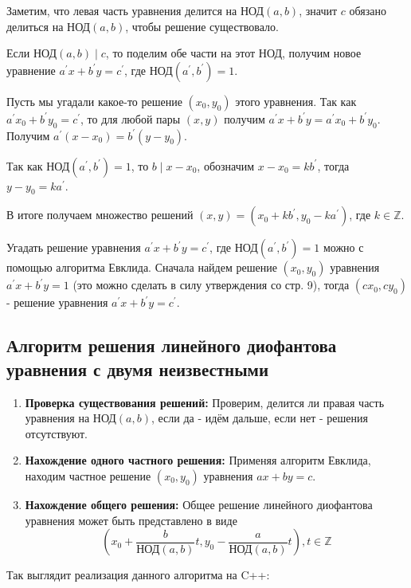 \documentclass[12pt, a4paper, openany]{book}
\begin{document}
    Заметим, что левая часть уравнения делится на $\text{НОД}(a, b)$, значит $c$ обязано делиться на $\text{НОД}(a, b)$, чтобы решение существовало.
    
    Если $\text{НОД}(a, b) \mid c$, то поделим обе части на этот НОД, получим новое уравнение $a^{'}x + b^{'}y = c^{'}$, где $\text{НОД}(a^{'}, b^{'}) = 1$.
    
    Пусть мы угадали какое-то решение $(x_0, y_0)$ этого уравнения. Так как $a^{'}x_0 + b^{'}y_0 = c^{'}$, то для любой пары $(x, y)$ получим $a^{'}x + b^{'}y = a^{'}x_0 + b^{'}y_0$. Получим $a^{'}(x - x_0) = b^{'}(y-y_0)$.
    
    Так как $\text{НОД}(a^{'}, b^{'}) = 1$, то $b \mid x - x_0$, обозначим $x - x_0 = kb^{'}$, тогда $y - y_0 = ka^{'}$.

\noindent
    В итоге получаем множество решений $(x, y) = (x_0 + kb^{'}, y_0 - ka^{'})$, где $k \in \mathbb{Z}$.
    
    Угадать решение уравнения $a^{'}x + b^{'}y = c^{'}$, где $\text{НОД}(a^{'}, b^{'}) = 1$ можно с помощью алгоритма Евклида. Сначала найдем решение $(x_0, y_0)$ уравнения $a^{'}x + b^{'}y = 1$ (это можно сделать в силу утверждения со стр. 9), тогда $(cx_0, cy_0)$ - решение уравнения $a^{'}x + b^{'}y = c^{'}$.

\subsection{Алгоритм решения линейного диофантова уравнения с двумя неизвестными}

\begin{enumerate}
    \item \textbf{Проверка существования решений:} Проверим, делится ли правая часть уравнения на $\text{НОД}(a, b)$, если да - идём дальше, если нет - решения отсутствуют.
    \item \textbf{Нахождение одного частного решения:} Применяя алгоритм Евклида, находим частное решение $(x_0, y_0)$ уравнения $ax + by = c$.
    \item \textbf{Нахождение общего решения:} Общее решение линейного диофантова уравнения может быть представлено в виде \\
    \[(x_0 + \frac{b}{\text{НОД}(a, b)} t, y_0 - \frac{a}{\text{НОД}(a, b)} t), t \in \mathbb{Z}\]
\end{enumerate}

\newpage
\noindent
    Так выглядит реализация данного алгоритма на C++:
\end{document}
